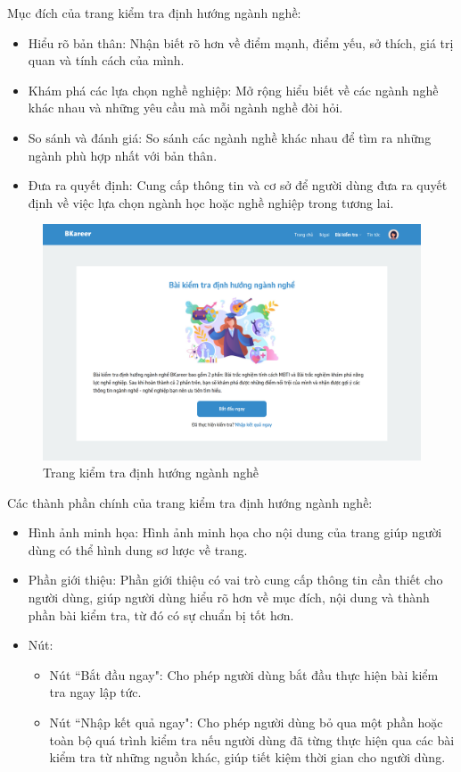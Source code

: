 Mục đích của trang kiểm tra định hướng ngành nghề:
\begin{itemize}
    \item Hiểu rõ bản thân: Nhận biết rõ hơn về điểm mạnh, điểm yếu, sở thích, giá trị quan và tính cách của mình.
    \item Khám phá các lựa chọn nghề nghiệp: Mở rộng hiểu biết về các ngành nghề khác nhau và những yêu cầu mà mỗi ngành nghề đòi hỏi.
    \item So sánh và đánh giá: So sánh các ngành nghề khác nhau để tìm ra những ngành phù hợp nhất với bản thân.
    \item Đưa ra quyết định: Cung cấp thông tin và cơ sở để người dùng đưa ra quyết định về việc lựa chọn ngành học hoặc nghề nghiệp trong tương lai.
\end{itemize}

\begin{figure}[H]
    \centering
    \includegraphics[width=0.8\linewidth]{images/chap5/majorTest.png}
    \vspace{0.5cm}
    \caption{Trang kiểm tra định hướng ngành nghề}
\end{figure}

Các thành phần chính của trang kiểm tra định hướng ngành nghề:
\begin{itemize}
    \item Hình ảnh minh họa: Hình ảnh minh họa cho nội dung của trang giúp người dùng có thể hình dung sơ lược về trang.
    \item Phần giới thiệu: Phần giới thiệu có vai trò cung cấp thông tin cần thiết cho người dùng, giúp người dùng hiểu rõ hơn về mục đích, nội dung và thành phần bài kiểm tra, từ đó có sự chuẩn bị tốt hơn.
    \item Nút:
        \begin{itemize}
            \item Nút ``Bắt đầu ngay": Cho phép người dùng bắt đầu thực hiện bài kiểm tra ngay lập tức.
            \item Nút ``Nhập kết quả ngay": Cho phép người dùng bỏ qua một phần hoặc toàn bộ quá trình kiểm tra nếu người dùng đã từng thực hiện qua các bài kiểm tra từ những nguồn khác, giúp tiết kiệm thời gian cho người dùng.
        \end{itemize}
\end{itemize}


